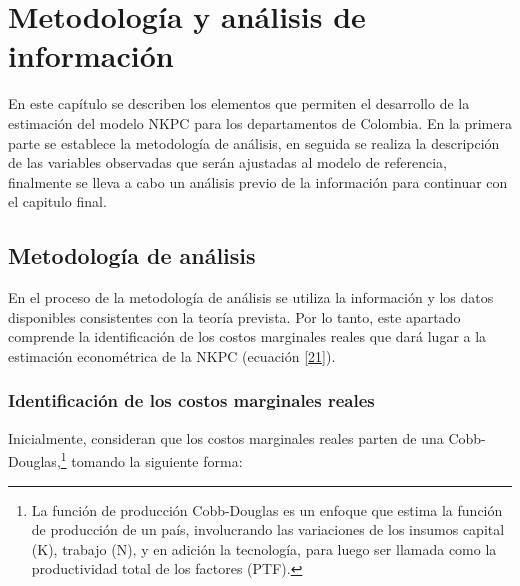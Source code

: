 \chapter{Metodología y análisis de información}\label{cap2}
En este capítulo se describen los elementos que permiten el desarrollo de la estimación del modelo NKPC para los departamentos de Colombia. En la primera parte se establece la metodología de análisis, en seguida se realiza la descripción de las variables observadas que serán ajustadas al modelo de referencia, finalmente se lleva a cabo un análisis previo de la información para continuar con el capitulo final.
\section{Metodología de análisis}
En el proceso de la metodología de análisis se utiliza la información y los datos disponibles consistentes con la teoría prevista. Por lo tanto, este apartado comprende la identificación de los costos marginales  reales que dará lugar a la estimación econométrica de la NKPC (ecuación \eqref{21}). 
\subsection{Identificación de los costos marginales reales}
Inicialmente,  \cite{gali1999inflation} consideran que los costos marginales reales parten de una Cobb-Douglas,\footnote{La función de producción Cobb-Douglas \citep{cobb1928theory,douglas1948there}  es un enfoque que estima la función de producción de un país, involucrando las variaciones de los insumos capital (K), trabajo (N), y en adición la tecnología, para luego ser llamada como la productividad total de los factores (PTF).}  tomando la siguiente forma: 

